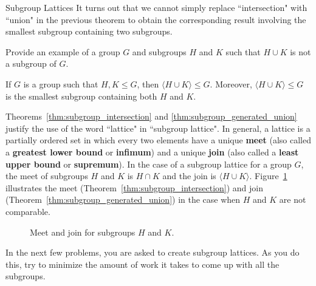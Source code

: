 \begin{section}{Subgroup Lattices}
It turns out that we cannot simply replace ``intersection" with ``union" in the previous theorem to obtain the corresponding result involving the smallest subgroup containing two subgroups.

\begin{problem}
Provide an example of a group $G$ and subgroups $H$ and $K$ such that $H\cup K$ is not a subgroup of $G$.
\end{problem}

\begin{theorem}\label{thm:subgroup_generated_union}
If $G$ is a group such that $H,K\leq G$, then $\langle H\cup K\rangle\leq G$. Moreover, $\langle H\cup K\rangle\leq G$ is the smallest subgroup containing both $H$ and $K$.
\end{theorem}

Theorems~\ref{thm:subgroup_intersection} and \ref{thm:subgroup_generated_union} justify the use of the word ``lattice" in ``subgroup lattice".  In general, a lattice is a partially ordered set in which every two elements have a unique \textbf{meet} (also called a \textbf{greatest lower bound} or \textbf{infimum}) and a unique \textbf{join} (also called a \textbf{least upper bound} or \textbf{supremum}).  In the case of a subgroup lattice for a group $G$, the meet of subgroups $H$ and $K$ is $H\cap K$ and the join is $\langle H\cup K\rangle$.  Figure~\ref{fig:diamond} illustrates the meet (Theorem~\ref{thm:subgroup_intersection}) and join (Theorem~\ref{thm:subgroup_generated_union}) in the case when $H$ and $K$ are not comparable.

\begin{figure}[!ht]
\centering
{}
\caption{Meet and join for subgroups $H$ and $K$.}
\label{fig:diamond}
\end{figure}

In the next few problems, you are asked to create subgroup lattices.  As you do this, try to minimize the amount of work it takes to come up with all the subgroups.


\end{section}
